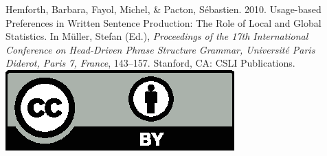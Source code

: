 \documentclass[a4paper,11pt]{article}
\begin{document}
\noindent



\vfill
\noindent
Hemforth, Barbara, Fayol, Michel, \& Pacton, Sébastien. 2010. Usage-based Preferences in Written Sentence
 Production: The Role of Local and Global Statistics. In Müller, Stefan (Ed.), \emph{{Proceedings of the 17th International Conference on Head-Driven Phrase Structure Grammar, Universit{\'e} Paris Diderot, Paris 7, France}}, 143--157. Stanford,
CA: CSLI Publications. \hfill\href{http://creativecommons.org/licenses/by/4.0/}{\includegraphics[height=.75em]{Includes/ccby.eps}}

\newpage

        
\end{document}
